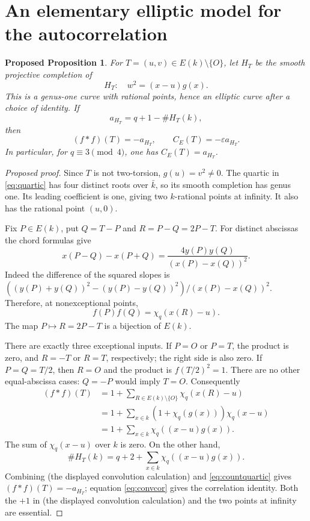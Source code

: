 \documentclass[11pt,a4paper]{article}
\numberwithin{equation}{section}
\newtheorem{prop}{Proposed Proposition}[section]
\begin{document}
\section{An elementary elliptic model for the autocorrelation}
\begin{prop}\label{prop:trace}
For $T=(u,v)\in E(k)\setminus\{O\}$, let $H_T$ be the smooth projective completion of
\begin{equation}\label{eq:quartic}
 H_T:\quad w^2=(x-u)g(x).
\end{equation}
This is a genus-one curve with rational points, hence an elliptic curve after a choice of identity. If
\begin{equation}
 a_{H_T}=q+1-\#H_T(k),
\end{equation}
then
\begin{equation}\label{eq:maintrace}
 \boxed{(f*f)(T)=-a_{H_T},\qquad
 C_E(T)=-\varepsilon a_{H_T}.}
\end{equation}
In particular, for $q\equiv3\pmod4$, one has $C_E(T)=a_{H_T}$.
\end{prop}
\begin{proof}[Proposed proof]
Since $T$ is not two-torsion, $g(u)=v^2\ne0$. The quartic in \eqref{eq:quartic} has four distinct roots over $\bar k$, so its smooth completion has genus one. Its leading coefficient is one, giving two $k$-rational points at infinity. It also has the rational point $(u,0)$.

Fix $P\in E(k)$, put $Q=T-P$ and $R=P-Q=2P-T$. For distinct abscissas the chord formulas give
\begin{equation}\label{eq:chord}
 x(P-Q)-x(P+Q)
 =\frac{4y(P)y(Q)}{(x(P)-x(Q))^2}.
\end{equation}
Indeed the difference of the squared slopes is
$((y(P)+y(Q))^2-(y(P)-y(Q))^2)/(x(P)-x(Q))^2$.
Therefore, at nonexceptional points,
\begin{equation}\label{eq:chartransfer}
 f(P)f(Q)=\chi_q(x(R)-u).
\end{equation}
The map $P\mapsto R=2P-T$ is a bijection of $E(k)$.

There are exactly three exceptional inputs. If $P=O$ or $P=T$, the product is zero, and $R=-T$ or $R=T$, respectively; the right side is also zero. If $P=Q=T/2$, then $R=O$ and the product is $f(T/2)^2=1$. There are no other equal-abscissa cases: $Q=-P$ would imply $T=O$. Consequently
\begin{align} (f*f)(T)
 &=1+\sum_{R\in E(k)\setminus\{O\}}\chi_q(x(R)-u)\\
 &=1+\sum_{x\in k}(1+\chi_q(g(x)))\chi_q(x-u)\\
 &=1+\sum_{x\in k}\chi_q((x-u)g(x)).
\end{align}
The sum of $\chi_q(x-u)$ over $k$ is zero. On the other hand,
\begin{equation}\label{eq:countquartic}
 \#H_T(k)=q+2+\sum_{x\in k}\chi_q((x-u)g(x)).
\end{equation}
Combining (the displayed convolution calculation) and \eqref{eq:countquartic} gives $(f*f)(T)=-a_{H_T}$; equation \eqref{eq:convcor} gives the correlation identity. Both the $+1$ in (the displayed convolution calculation) and the two points at infinity are essential.
\end{proof}
\end{document}

